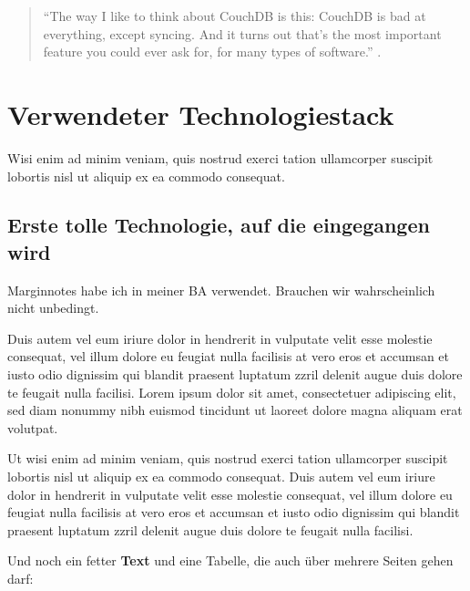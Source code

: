 \begin{citeenv}
	\begin{quotation}
		"`The way I like to think about CouchDB is this: CouchDB is bad at everything, except syncing. And it turns out that's the most important feature you could ever ask for, for many types of software."' \cite{pouch:replication}.
	\end{quotation}
\end{citeenv}


\chapter{Verwendeter Technologiestack}
\label{chap:Technologien}
Wisi enim ad minim veniam, quis nostrud exerci tation ullamcorper suscipit lobortis nisl ut aliquip ex ea commodo consequat.

\section{Erste tolle Technologie, auf die eingegangen wird}
\label{sec:Erste Technologie}

 Marginnotes habe ich in meiner BA verwendet. Brauchen wir wahrscheinlich nicht unbedingt.

Duis autem vel eum iriure dolor in hendrerit in vulputate velit esse molestie consequat, vel illum dolore eu feugiat nulla facilisis at vero eros et accumsan et iusto odio dignissim qui blandit praesent luptatum zzril delenit augue duis dolore te feugait nulla facilisi. Lorem ipsum dolor sit amet, consectetuer adipiscing elit, sed diam nonummy nibh euismod tincidunt ut laoreet dolore magna aliquam erat volutpat.

Ut wisi enim ad minim veniam, quis nostrud exerci tation ullamcorper suscipit lobortis nisl ut aliquip ex ea commodo consequat. Duis autem vel eum iriure dolor in hendrerit in vulputate velit esse molestie consequat, vel illum dolore eu feugiat nulla facilisis at vero eros et accumsan et iusto odio dignissim qui blandit praesent luptatum zzril delenit augue duis dolore te feugait nulla facilisi.

Und noch ein fetter \textbf{Text} und eine Tabelle, die auch über mehrere Seiten gehen darf:

